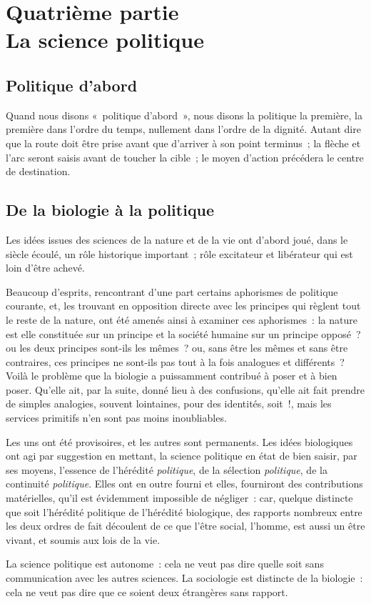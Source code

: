 \documentclass[french,twoside]{book} %
\newcommand\chapteropen{} %
\newcommand\chaptercont{} %
\begin{document}
\chapteropen
\chapter[{Quatrième partie. La science politique}]{Quatrième partie \\
La science politique}\renewcommand{\leftmark}{Quatrième partie \\
La science politique}


\chaptercont
\section[{Politique d’abord}]{Politique d’abord}
\noindent Quand nous disons « politique d’abord », nous disons la politique la première, la première dans l’ordre du temps, nullement dans l’ordre de la dignité. Autant dire que la route doit être prise avant que d’arriver à son point terminus ; la flèche et l’arc seront saisis avant de toucher la cible ; le moyen d’action précédera le centre de destination.
\section[{De la biologie à la politique}]{De la biologie à la politique}
\noindent Les idées issues des sciences de la nature et de la vie ont d’abord joué, dans le siècle écoulé, un rôle historique important ; rôle excitateur et libérateur qui est loin d’être achevé.\par
Beaucoup d’esprits, rencontrant d’une part certains aphorismes de politique courante, et, les trouvant en opposition directe avec les principes qui règlent tout le reste de la nature, ont été amenés ainsi à examiner ces aphorismes : la nature est elle constituée sur un principe et la société humaine sur un principe opposé ? ou les deux principes sont-ils les mêmes ? ou, sans être les mêmes et sans être contraires, ces principes ne sont-ils pas tout à la fois analogues et différents ? Voilà le problème que la biologie a puissamment contribué à poser et à bien poser. Qu’elle ait, par la suite, donné lieu à des confusions, qu’elle ait fait prendre de simples analogies, souvent lointaines, pour des identités, soit !, mais les services primitifs n’en sont pas moins inoubliables.\par
Les uns ont été provisoires, et les autres sont permanents. Les idées biologiques ont agi par suggestion en mettant, la science politique en état de bien saisir, par ses moyens, l’essence de l’hérédité \emph{politique}, de la sélection \emph{politique}, de la continuité \emph{politique}. Elles ont en outre fourni et elles, fourniront des contributions matérielles, qu’il est évidemment impossible de négliger : car, quelque distincte que soit l’hérédité politique de l’hérédité biologique, des rapports nombreux entre les deux ordres de fait découlent de ce que l’être social, l’homme, est aussi un être vivant, et soumis aux lois de la vie.\par
La science politique est autonome : cela ne veut pas dire quelle soit sans communication avec les autres sciences. La sociologie est distincte de la biologie : cela ne veut pas dire que ce soient deux étrangères sans rapport.\par
\end{document}
